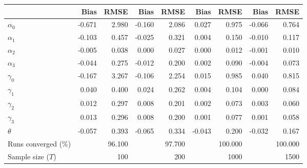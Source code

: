 
\begin{tabular}[t]{lrrrrrrrr}
\toprule
  & Bias & RMSE & Bias & RMSE & Bias & RMSE & Bias & RMSE\\
\midrule
$\alpha_{0}$ & -0.671 & 2.980 & -0.160 & 2.086 & 0.027 & 0.975 & -0.066 & 0.764\\
$\alpha_{1}$ & -0.103 & 0.457 & -0.025 & 0.321 & 0.004 & 0.150 & -0.010 & 0.117\\
$\alpha_{2}$ & -0.005 & 0.038 & 0.000 & 0.027 & 0.000 & 0.012 & -0.001 & 0.010\\
$\alpha_{3}$ & -0.044 & 0.275 & -0.012 & 0.200 & 0.002 & 0.090 & -0.004 & 0.073\\
$\gamma_{0}$ & -0.167 & 3.267 & -0.106 & 2.254 & 0.015 & 0.985 & 0.040 & 0.815\\
$\gamma_{1}$ & 0.040 & 0.400 & 0.024 & 0.262 & 0.004 & 0.104 & 0.000 & 0.084\\
$\gamma_{2}$ & 0.012 & 0.297 & 0.008 & 0.201 & 0.002 & 0.073 & 0.003 & 0.060\\
$\gamma_{3}$ & 0.013 & 0.296 & 0.008 & 0.200 & 0.001 & 0.077 & 0.001 & 0.058\\
$\theta$ & -0.057 & 0.393 & -0.065 & 0.334 & -0.043 & 0.200 & -0.032 & 0.167\\
Runs converged (\%) &  & 96.100 &  & 97.700 &  & 100.000 &  & 100.000\\
Sample size ($T$) &  & 100 &  & 200 &  & 1000 &  & 1500\\
\bottomrule
\end{tabular}

